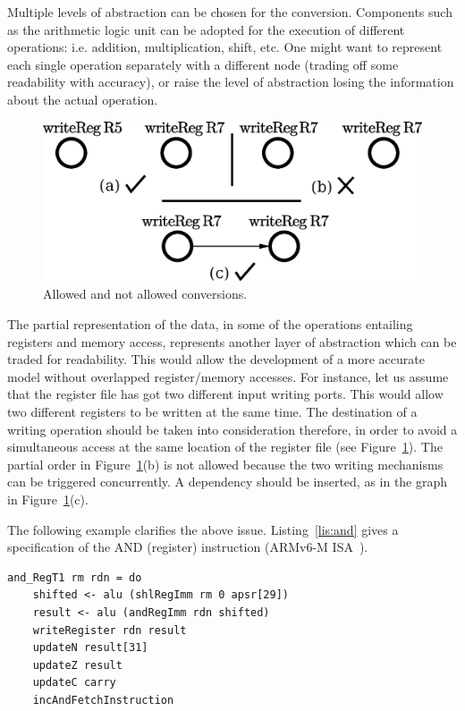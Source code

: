 \documentclass[conference]{IEEEtran}
\begin{document}
Multiple levels of abstraction can be chosen for the conversion. Components such as the
arithmetic logic unit can be adopted for the execution of
different operations: i.e. addition, multiplication, shift, etc. One might want to represent
each single operation separately with a different node 
(trading off some readability with accuracy), or raise the
level of abstraction losing the information about the actual operation.

\begin{figure}[ht!]
\begin{center}
	\includegraphics[width=\linewidth]{IMG/depPO.eps}
	\caption{Allowed and not allowed conversions.}
	\label{fig:depPO}
\end{center}
\end{figure}

The partial representation of the data, in some of the operations entailing registers and
memory access, represents another layer of abstraction which can be traded for readability.
This would allow the development of a more accurate model without overlapped register/memory
accesses. For instance, let us assume that the register file has got two different input
writing ports. This would allow two different registers to be written at the same time.
The destination of a writing operation should be taken into consideration therefore,
in order to avoid a simultaneous access at the same location of the register file
(see Figure~\ref{fig:depPO}). The partial order in Figure~\ref{fig:depPO}(b) is not allowed
because the two writing mechanisms can be triggered concurrently.
A dependency should be inserted, as in the graph in Figure~\ref{fig:depPO}(c).

The following example clarifies the above issue. 
Listing~\ref{lis:and} gives a specification of the AND (register) instruction (ARMv6-M ISA~\cite{armManual}).\\

\begin{lstlisting}[caption=AND (register) instruction - Haskell-based specification,
frame=single, label=lis:and]
and_RegT1 rm rdn = do
    shifted <- alu (shlRegImm rm 0 apsr[29])
    result <- alu (andRegImm rdn shifted)
    writeRegister rdn result
    updateN result[31]
    updateZ result
    updateC carry
    incAndFetchInstruction
\end{lstlisting}
\end{document}
